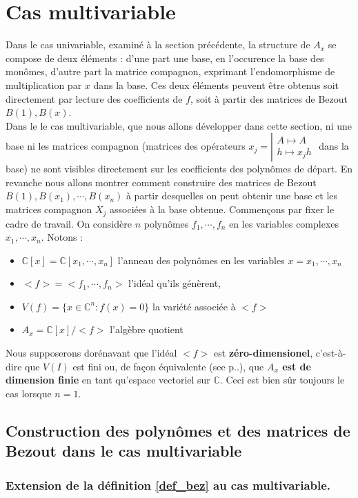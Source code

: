 \documentclass{article}
\theoremstyle{plain}%
\theoremstyle{definition}
\theoremstyle{remark}
\newcommand{\C}{\mathbb{C}}
\begin{document}
\section{Cas multivariable}
Dans le cas univariable, examiné à la section précédente, la structure de $A_x$ se compose de deux éléments : d'une part une base, en l'occurence la base des monômes, d'autre part la matrice compagnon, exprimant l'endomorphisme de multiplication par $x$ dans la base. Ces deux éléments peuvent être obtenus soit directement par lecture des coefficients de $f$, soit à partir des matrices de Bezout $B(1), B(x)$. \\
Dans le le cas multivariable, que nous allons développer dans cette section, ni une base ni les matrices compagnon 
(matrices des opérateurs
$x_j = \left\vert
\begin{array}{c}
A \mapsto A \\
h \mapsto x_jh
\end{array} 
\right.$ dans la base) ne sont visibles directement sur les coefficients des polynômes de départ. En revanche nous allons montrer comment construire des matrices de Bezout $B(1), B(x_1), \cdots, B(x_n)$ à partir desquelles on peut obtenir une base et les matrices compagnon $X_j$ associées à la base obtenue. Commençons par fixer le cadre de travail.
On considère $n$ polynômes $f_1,\cdots, f_n$ en les variables complexes $x_1,\cdots, x_n$. Notons :
\begin{itemize}
\item $\C[x] = \C[x_1,\cdots, x_n]$ l'anneau des polynômes en les variables $x = x_1,\cdots, x_n$
\item $<f> = <f_1,\cdots, f_n>$ l'idéal qu'ils génèrent,
\item $V(f) = \{x \in \C^n : f(x) = 0\}$ la variété associée à $<f>$
\item $A_x = \C[x]/<f>$ l'algèbre quotient
\end{itemize}
Nous supposerons dorénavant que l'idéal $<f>$ est {\bf zéro-dimensionel}, 
c'est-à-dire que $V(I)$ est fini ou, de façon équivalente  (see \cite{clo} p..), que {\bf $A_x$ est de dimension finie} en tant qu'espace vectoriel sur $\C$. Ceci est bien sûr toujours le cas lorsque $n = 1$.

\subsection{Construction des polynômes et des matrices de Bezout dans le cas multivariable}

\subsubsection{Extension de la définition \ref{def_bez} au cas multivariable.}
\label{def_bez_multi}
\end{document}
